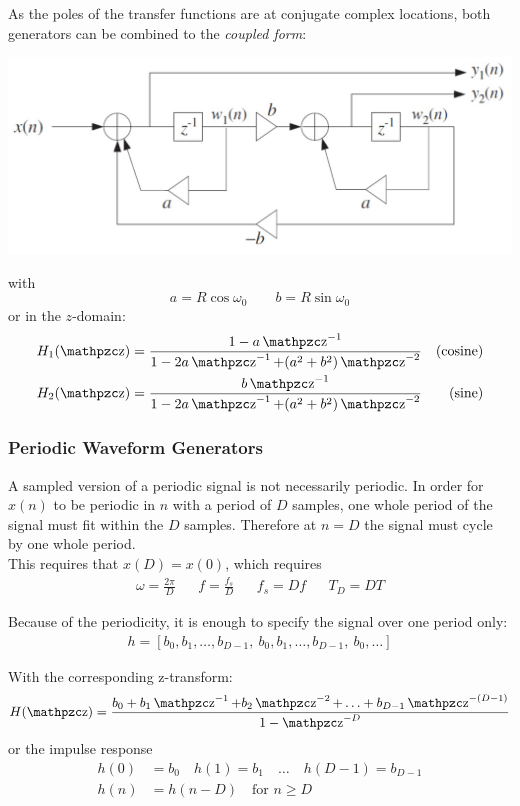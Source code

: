 As the poles of the transfer functions are at conjugate complex locations, both generators can be combined to the \emph{coupled form}:

\begin{center}
	\includegraphics[width=\linewidth]{images/SignProcApp_SinCoupledForm.jpg}
\end{center}
with
\begin{equation*}
	a = R \cos \omega_0 \qquad b = R \sin \omega_0
\end{equation*}
or in the $z$-domain:
\begin{align*}
	H_1(\z) &= \frac{1 - a \z^{-1}}{1 - 2 a \z^{-1} + (a^2+b^2) \z^{-2}}  &\text{(cosine)} \\
	H_2(\z) &= \frac{b \z^{-1}}{1 - 2 a \z^{-1} + (a^2+b^2) \z^{-2}} &\text{(sine)}
\end{align*}

\subsubsection{Periodic Waveform Generators}
A sampled version of a periodic signal is not necessarily periodic.
In order for $x(n)$ to be periodic in $n$ with a period of $D$ samples,
one whole period of the signal must fit within the $D$ samples.
Therefore at $n = D$ the signal must cycle by one whole period. \\

This requires that $x(D) = x(0)$, which requires
\begin{align*}
	\omega = \frac{2\pi}{D} && f = \frac{f_s}{D} && f_s = Df && T_D = DT
\end{align*}


Because of the periodicity, it is enough to specify the signal over one period only:
\begin{align*}
	h = [b_0, b_1, \ldots, b_{D-1}, \: b_0, b_1, \ldots, b_{D-1}, \: b_0, \ldots]
\end{align*}

With the corresponding z-transform:
\begin{align*}
	H(\z) = \frac{b_0 + b_1 \z^{-1} + b_2 \z^{-2} + \ldots + b_{D-1} \z^{-(D-1)}}{1 - \z^{-D}}
\end{align*}
or the impulse response
\begin{align*}
	h(0) &= b_0 \quad h(1) = b_1 \quad \ldots \quad h(D-1) = b_{D-1} \\
	h(n) &= h(n-D) \quad \text{for } n \geq D
\end{align*}

